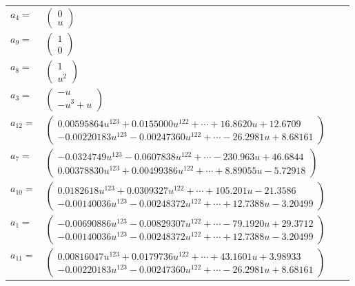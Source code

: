 \documentclass[1p]{elsarticle_modified}
\theoremstyle{definition}
\begin{document}
\begin{tabular}{m{7pt} m{180pt} m{7pt} m{180pt} }
\flushright $a_{4}=$&$\begin{pmatrix}0\\u\end{pmatrix}$ \\
\flushright $a_{9}=$&$\begin{pmatrix}1\\0\end{pmatrix}$ \\
\flushright $a_{8}=$&$\begin{pmatrix}1\\u^2\end{pmatrix}$ \\
\flushright $a_{3}=$&$\begin{pmatrix}- u\\- u^3+u\end{pmatrix}$ \\
\flushright $a_{12}=$&$\begin{pmatrix}0.00595864 u^{123}+0.0155000 u^{122}+\cdots+16.8620 u+12.6709\\-0.00220183 u^{123}-0.00247360 u^{122}+\cdots-26.2981 u+8.68161\end{pmatrix}$ \\
\flushright $a_{7}=$&$\begin{pmatrix}-0.0324749 u^{123}-0.0607838 u^{122}+\cdots-230.963 u+46.6844\\0.00378830 u^{123}+0.00499386 u^{122}+\cdots+8.89055 u-5.72918\end{pmatrix}$ \\
\flushright $a_{10}=$&$\begin{pmatrix}0.0182618 u^{123}+0.0309327 u^{122}+\cdots+105.201 u-21.3586\\-0.00140036 u^{123}-0.00248372 u^{122}+\cdots+12.7388 u-3.20499\end{pmatrix}$ \\
\flushright $a_{1}=$&$\begin{pmatrix}-0.00690886 u^{123}-0.00829307 u^{122}+\cdots-79.1920 u+29.3712\\-0.00140036 u^{123}-0.00248372 u^{122}+\cdots+12.7388 u-3.20499\end{pmatrix}$ \\
\flushright $a_{11}=$&$\begin{pmatrix}0.00816047 u^{123}+0.0179736 u^{122}+\cdots+43.1601 u+3.98933\\-0.00220183 u^{123}-0.00247360 u^{122}+\cdots-26.2981 u+8.68161\end{pmatrix}$ \\

\end{tabular}
\end{document}
